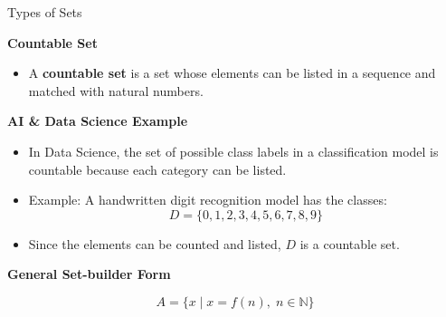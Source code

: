 \documentclass{beamer}
\begin{document}
\begin{frame}{Types of Sets}

\textbf{Countable Set}

\begin{itemize}
    \item A \textbf{countable set} is a set whose elements can be listed in a sequence and matched with natural numbers.
\end{itemize}

\vspace{0.3cm}

\textbf{AI \& Data Science Example}

\begin{itemize}
    \item In Data Science, the set of possible class labels in a classification model is countable because each category can be listed.
    \item Example: A handwritten digit recognition model has the classes:
    \[
    D=\{0,1,2,3,4,5,6,7,8,9\}
    \]
    \item Since the elements can be counted and listed, \(D\) is a countable set.
\end{itemize}

\vspace{0.3cm}

\textbf{General Set-builder Form}

\[
A=\{x \mid x=f(n),\; n\in\mathbb{N}\}
\]

\end{frame}
\end{document}
